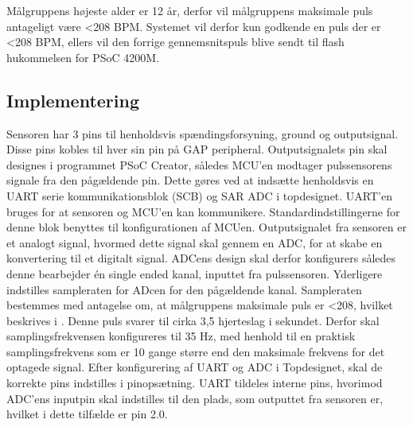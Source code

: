 Målgruppens højeste alder er 12 år, derfor vil målgruppens maksimale puls antageligt være <208 BPM. Systemet vil derfor kun godkende en puls der er <208 BPM, ellers vil den forrige gennemsnitspuls blive sendt til flash hukommelsen for PSoC 4200M.


\subsection{Implementering}
Sensoren har 3 pins til henholdsvis spændingsforsyning, ground og outputsignal. Disse pins kobles til hver sin pin på GAP peripheral. Outputsignalets pin skal designes i programmet PSoC Creator, således MCU'en modtager pulssensorens signale fra den pågældende pin. Dette gøres ved at indsætte henholdsvis en UART serie kommunikationsblok (SCB) og SAR ADC i topdesignet. UART'en bruges for at sensoren og MCU'en kan kommunikere. Standardindstillingerne for denne blok benyttes til konfigurationen af MCUen. \newline
Outputsignalet fra sensoren er et analogt signal, hvormed dette signal skal gennem en ADC, for at skabe en konvertering til et digitalt signal. ADCens design skal derfor konfigurers således denne bearbejder én single ended kanal, inputtet fra pulssensoren. Yderligere indstilles sampleraten for ADcen for den pågældende kanal. Sampleraten bestemmes med antagelse om, at målgruppens maksimale puls er <208, hvilket beskrives i . Denne puls svarer til cirka 3,5 hjerteslag i sekundet. Derfor skal samplingsfrekvensen konfigureres til 35 Hz, med henhold til en praktisk samplingsfrekvens som er 10 gange større end den maksimale frekvens for det optagede signal.\newline
Efter konfigurering af UART og ADC i Topdesignet, skal de korrekte pins indstilles i pinopsætning. UART tildeles interne pins, hvorimod ADC'ens inputpin skal indstilles til den plads, som outputtet fra sensoren er, hvilket i dette tilfælde er pin 2.0. 



